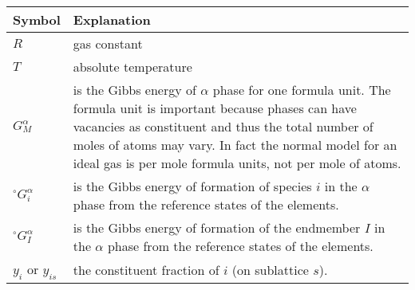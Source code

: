 \documentclass[12pt]{article}
\begin{document}
\begin{tabular}{l p{150mm}}
Symbol & Explanation\\\hline
$R$          & gas constant\\
$T$          & absolute temperature\\
$G_M^{\alpha}$ & is the Gibbs energy of $\alpha$ phase for one formula
    unit.  The formula unit is important because phases can have vacancies
    as constituent and thus the total number of moles of atoms may vary.
    In fact the normal model for an ideal gas is per mole formula units, 
    not per mole of atoms.\\
$^{\circ}G_i^{\alpha}$ & is the Gibbs energy of formation of species $i$ in the
$\alpha$ phase from the reference states of the elements.\\
$^{\circ}G_I^{\alpha}$ & is the Gibbs energy of formation of the endmember $I$
    in the $\alpha$ phase from the reference states of the elements.\\
$y_{i}$ or $y_{is}$ & the constituent fraction of $i$ (on sublattice $s$).\\\hline
\end{tabular}

\bigskip
\end{document}
